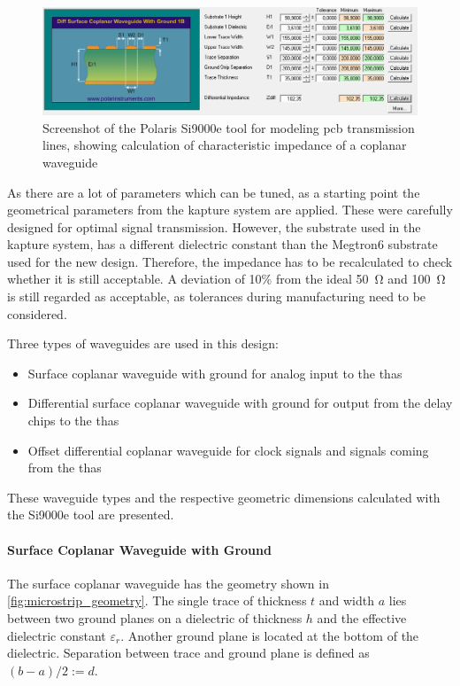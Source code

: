 \begin{figure}[tbh]
	\centering
	\includegraphics[width = \textwidth]{chap/04-theresa/img/polaris}
	\caption[Screenshot of the Polaris Si9000e]{Screenshot of the Polaris Si9000e tool for modeling \gls{pcb} transmission lines, showing calculation of characteristic impedance of a coplanar waveguide}
	\label{fig:polaris}
\end{figure}

As there are a lot of parameters which can be tuned, as a starting point the geometrical parameters from the \gls{kapture} system are applied. 
These were carefully designed for optimal signal transmission.
However, the substrate used in the \gls{kapture} system, has a different dielectric constant than the Megtron6 substrate used for the new design. 
Therefore, the impedance has to be recalculated to check whether it is still acceptable. 
A deviation of 10\% from the ideal \SI{50}{\ohm} and \SI{100}{\ohm} is still regarded as acceptable, as tolerances during manufacturing need to be considered.

Three types of waveguides are used in this design:
\begin{itemize}
	\item Surface coplanar waveguide with ground for analog input to the \glspl{tha} 
	\item Differential surface coplanar waveguide with ground for output from the delay chips to the \glspl{tha}
	\item Offset differential coplanar waveguide for clock signals and signals coming from the \glspl{tha}
\end{itemize}
These waveguide types and the respective geometric dimensions calculated with the Si9000e tool are presented.

\paragraph{Surface Coplanar Waveguide with Ground}
The surface coplanar waveguide has the geometry shown in \autoref{fig:microstrip_geometry}.
The single trace of thickness $t$ and width $a$ lies between two ground planes on a dielectric of thickness $h$ and the effective dielectric constant $\varepsilon_r$.
Another ground plane is located at the bottom of the dielectric.
Separation between trace and ground plane is defined as $(b-a)/2 := d$. 

